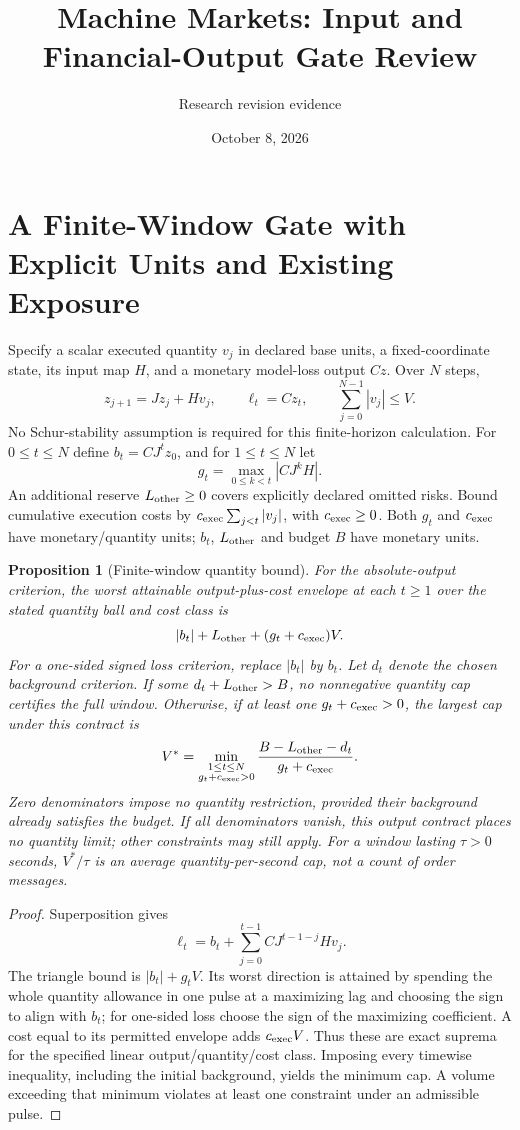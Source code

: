 \documentclass[11pt]{article}
\title{Machine Markets: Input and Financial-Output Gate Review}
\author{Research revision evidence}\date{October 8, 2026}
\newtheorem{proposition}{Proposition}
\begin{document}
\maketitle

\section{A Finite-Window Gate with Explicit Units and Existing Exposure}
Specify a scalar executed quantity $v_j$ in declared base units, a fixed-coordinate state, its input map $H$, and a monetary model-loss output $Cz$. Over $N$ steps,
\[
z_{j+1}=Jz_j+Hv_j,\qquad \ell_t=Cz_t,\qquad
\sum_{j=0}^{N-1}|v_j|\le V.
\]
No Schur-stability assumption is required for this finite-horizon calculation. For $0\le t\le N$ define $b_t=CJ^tz_0$, and for $1\le t\le N$ let
\[
g_t=\max_{0\le k<t}|CJ^kH|.
\]
An additional reserve $L_{\rm other}\ge0$ covers explicitly declared omitted risks. Bound cumulative execution costs by $c_{\rm exec}\sum_{j<t}|v_j|$, with $c_{\rm exec}\ge0$. Both $g_t$ and $c_{\rm exec}$ have monetary/quantity units; $b_t$, $L_{\rm other}$ and budget $B$ have monetary units.

\begin{proposition}[Finite-window quantity bound]
For the absolute-output criterion, the worst attainable output-plus-cost envelope at each $t\ge1$ over the stated quantity ball and cost class is
\[
|b_t|+L_{\rm other}+(g_t+c_{\rm exec})V.
\]
For a one-sided signed loss criterion, replace $|b_t|$ by $b_t$. Let $d_t$ denote the chosen background criterion. If some $d_t+L_{\rm other}>B$, no nonnegative quantity cap certifies the full window. Otherwise, if at least one $g_t+c_{\rm exec}>0$, the largest cap under this contract is
\[
V^*=\min_{\substack{1\le t\le N\\g_t+c_{\rm exec}>0}}
\frac{B-L_{\rm other}-d_t}{g_t+c_{\rm exec}}.
\]
Zero denominators impose no quantity restriction, provided their background already satisfies the budget. If all denominators vanish, this output contract places no quantity limit; other constraints may still apply. For a window lasting $\tau>0$ seconds, $V^*/\tau$ is an average quantity-per-second cap, not a count of order messages.
\end{proposition}
\begin{proof}
Superposition gives
\[
\ell_t=b_t+\sum_{j=0}^{t-1}CJ^{t-1-j}Hv_j.
\]
The triangle bound is $|b_t|+g_tV$. Its worst direction is attained by spending the whole quantity allowance in one pulse at a maximizing lag and choosing the sign to align with $b_t$; for one-sided loss choose the sign of the maximizing coefficient. A cost equal to its permitted envelope adds $c_{\rm exec}V$. Thus these are exact suprema for the specified linear output/quantity/cost class. Imposing every timewise inequality, including the initial background, yields the minimum cap. A volume exceeding that minimum violates at least one constraint under an admissible pulse.
\end{proof}
\end{document}
